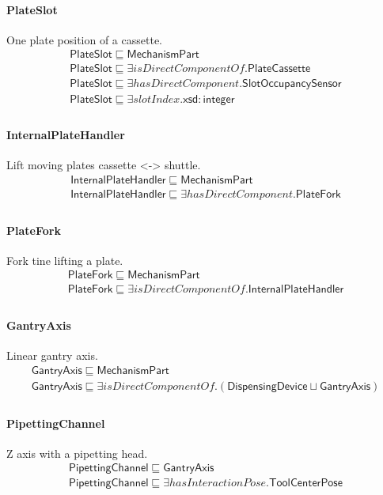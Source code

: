 \documentclass[10pt]{article}
\begin{document}
\paragraph{PlateSlot} One plate position of a cassette.
\[\begin{array}{l}
\mathsf{PlateSlot} \sqsubseteq  \mathsf{MechanismPart} \\
\mathsf{PlateSlot} \sqsubseteq  \exists \mathit{isDirectComponentOf}.\mathsf{PlateCassette} \\
\mathsf{PlateSlot} \sqsubseteq  \exists \mathit{hasDirectComponent}.\mathsf{SlotOccupancySensor} \\
\mathsf{PlateSlot} \sqsubseteq  \exists \mathit{slotIndex}.\mathsf{xsd{:}integer} \\
\end{array}\]
\paragraph{InternalPlateHandler} Lift moving plates cassette <-> shuttle.
\[\begin{array}{l}
\mathsf{InternalPlateHandler} \sqsubseteq  \mathsf{MechanismPart} \\
\mathsf{InternalPlateHandler} \sqsubseteq  \exists \mathit{hasDirectComponent}.\mathsf{PlateFork} \\
\end{array}\]
\paragraph{PlateFork} Fork tine lifting a plate.
\[\begin{array}{l}
\mathsf{PlateFork} \sqsubseteq  \mathsf{MechanismPart} \\
\mathsf{PlateFork} \sqsubseteq  \exists \mathit{isDirectComponentOf}.\mathsf{InternalPlateHandler} \\
\end{array}\]
\paragraph{GantryAxis} Linear gantry axis.
\[\begin{array}{l}
\mathsf{GantryAxis} \sqsubseteq  \mathsf{MechanismPart} \\
\mathsf{GantryAxis} \sqsubseteq  \exists \mathit{isDirectComponentOf}.(\mathsf{DispensingDevice} \sqcup  \mathsf{GantryAxis}) \\
\end{array}\]
\paragraph{PipettingChannel} Z axis with a pipetting head.
\[\begin{array}{l}
\mathsf{PipettingChannel} \sqsubseteq  \mathsf{GantryAxis} \\
\mathsf{PipettingChannel} \sqsubseteq  \exists \mathit{hasInteractionPose}.\mathsf{ToolCenterPose} \\
\end{array}\]
\end{document}
